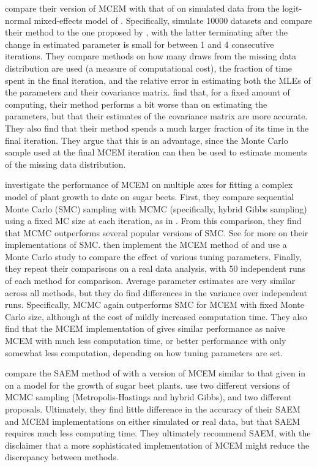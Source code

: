 \documentclass[ss]{imsart}
\theoremstyle{plain}
\theoremstyle{definition}
\theoremstyle{remark}
\begin{document}
\citet{Caf05} compare their version of MCEM with that of \citet{Boo99} on simulated data from the logit-normal mixed-effects model of \citet{McC97}. Specifically, \citeauthor{Caf05} simulate 10000 datasets and compare their method to the one proposed by \citet{Boo99}, with the latter terminating after the change in estimated parameter is small for between 1 and 4 consecutive iterations. They compare methods on how many draws from the missing data distribution are used (a measure of computational cost), the fraction of time spent in the final iteration, and the relative error in estimating both the MLEs of the parameters and their covariance matrix. \citeauthor{Caf05} find that, for a fixed amount of computing, their method performs a bit worse than \citet{Boo99} on estimating the parameters, but that their estimates of the covariance matrix are more accurate. They also find that their method spends a much larger fraction of its time in the final iteration. They argue that this is an advantage, since the Monte Carlo sample used at the final MCEM iteration can then be used to estimate moments of the missing data distribution.

\citet{Tre14} investigate the performance of MCEM on multiple axes for fitting a complex model of plant growth to date on sugar beets. First, they compare sequential Monte Carlo (SMC) sampling with MCMC (specifically, hybrid Gibbs sampling) using a fixed MC size at each iteration, as in \citet{Wei90}. From this comparison, they find that MCMC outperforms several popular versions of SMC. See \citet{Tre13} for more on their implementations of SMC. \citeauthor{Tre14} then implement the MCEM method of \citet{Caf05} and use a Monte Carlo study to compare the effect of various tuning parameters. Finally, they repeat their comparisons on a real data analysis, with 50 independent runs of each method for comparison. Average parameter estimates are very similar across all methods, but they do find differences in the variance over independent runs. Specifically, MCMC again outperforms SMC for MCEM with fixed Monte Carlo size, although at the cost of mildly increased computation time. They also find that the MCEM implementation of \citet{Caf05} gives similar performance as naive MCEM with much less computation time, or better performance with only somewhat less computation, depending on how tuning parameters are set.

\citet{Bae16} compare the SAEM method of \citet{Del99} with a version of MCEM similar to that given in \citet{McC97} on a model for the growth of sugar beet plants. \citeauthor{Bae16} use two different versions of MCMC sampling (Metropolis-Hastings and hybrid Gibbs), and two different proposals. Ultimately, they find little difference in the accuracy of their SAEM and MCEM implementations on either simulated or real data, but that SAEM requires much less computing time. They ultimately recommend SAEM, with the disclaimer that a more sophisticated implementation of MCEM \citep[e.g.,][]{Caf05,Boo99} might reduce the discrepancy between methods.
\end{document}
